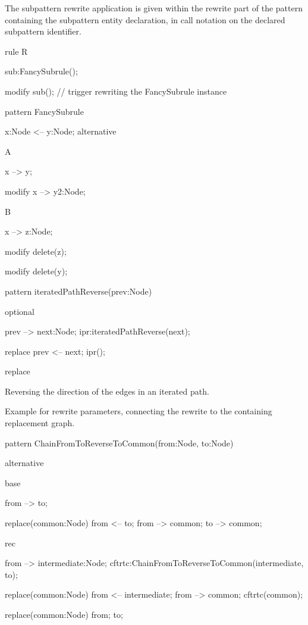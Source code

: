 The subpattern rewrite application is given within the rewrite part of the pattern containing the subpattern entity declaration, in call notation on the declared subpattern identifier.

\begin{example}
  \begin{grgen}
rule R {
  sub:FancySubrule();

  modify {
    sub();        // trigger rewriting the FancySubrule instance
  }
}

pattern FancySubrule {
  x:Node <-- y:Node;
  alternative {
    A {
      x --> y;

      modify {
        x --> y2:Node;
      }
    }
    B {
      x --> z:Node;

      modify {
        delete(z);
      }
    }
  }

  modify {
    delete(y);
  }
}
  \end{grgen}
\end{example}

\begin{example}
  \begin{grgen}
pattern iteratedPathReverse(prev:Node) {
  optional {
    prev --> next:Node;
    ipr:iteratedPathReverse(next);
    
    replace {
    	prev <-- next;
    	ipr();
    }
  }
  
  replace { }
}
  \end{grgen}
  Reversing the direction of the edges in an iterated path.
\end{example}

\begin{example}
Example for rewrite parameters, connecting the rewrite to the containing replacement
graph.

  \begin{grgen}
pattern ChainFromToReverseToCommon(from:Node, to:Node) {
  alternative {
    base {
      from --> to;

      replace(common:Node) {
        from <-- to;
        from --> common;
        to --> common;
      }
    }
    rec {
      from --> intermediate:Node;
      cftrtc:ChainFromToReverseToCommon(intermediate, to);

      replace(common:Node) {
        from <-- intermediate;
        from --> common;
        cftrtc(common);
      }
    }
  }

  replace(common:Node) {
    from; to;
  }
}
  \end{grgen}
\end{example}


